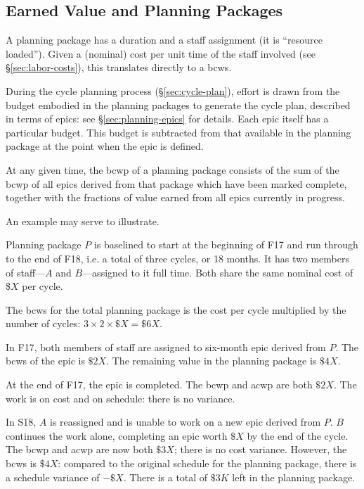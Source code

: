 \subsection{Earned Value and Planning Packages}
\label{sec:long-term-value}

A planning package has a duration and a staff assignment (it is ``resource loaded'').
Given a (nominal) cost per unit time of the staff involved (see \S\ref{sec:labor-costs}), this translates directly to a \gls{bcws}.

During the \gls{cycle} planning process (\S\ref{sec:cycle-plan}), effort is drawn from the budget embodied in the planning packages to generate the \gls{cycle} plan, described in terms of \glspl{epic}: see \S\ref{sec:planning-epics} for details.
Each \gls{epic} itself has a particular budget.
This budget is subtracted from that available in the planning package at the point when the \gls{epic} is defined.

At any given time, the \gls{bcwp} of a planning package consists of the sum of the \gls{bcwp} of all \glspl{epic} derived from that package which have been marked complete, together with the fractions of value earned from all \glspl{epic} currently in progress.

An example may serve to illustrate.

Planning package \(P\) is baselined to start at the beginning of F17 and run through to the end of F18, i.e. a total of three \glspl{cycle}, or 18 months. It has two members of staff---\(A\) and \(B\)---assigned to it full time.
Both share the same nominal cost of \$\(X\) per \gls{cycle}.

The \gls{bcws} for the total planning package is the cost per \gls{cycle} multiplied by the number of \glspl{cycle}: \(3 \times 2 \times \$X = \$6X\).

In F17, both members of staff are assigned to six-month \gls{epic} derived from \(P\).
The \gls{bcws} of the \gls{epic} is \(\$2X\).
The remaining value in the planning package is \(\$4X\).

At the end of F17, the \gls{epic} is completed.
The \gls{bcwp} and \gls{acwp} are both \(\$2X\).
The work is on cost and on schedule: there is no variance.

In S18, \(A\) is reassigned and is unable to work on a new \gls{epic} derived from \(P\).
\(B\) continues the work alone, completing an \gls{epic} worth \(\$X\) by the end of the \gls{cycle}.
The \gls{bcwp} and \gls{acwp} are now both \(\$3X\); there is no cost variance.
However, the \gls{bcws} is \(\$4X\): compared to the original schedule for the planning package, there is a schedule variance of \(-\$X\).
There is a total of \(\$3K\) left in the planning package.

